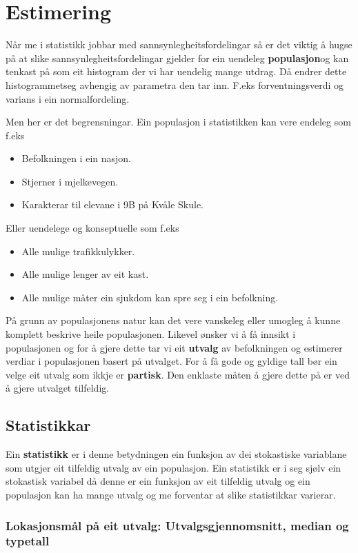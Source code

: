 \chapter{Estimering}
Når me i statistikk jobbar med sannsynlegheitsfordelingar så er det viktig å hugse på at slike sannsynlegheitsfordelingar gjelder for ein uendeleg \startsitat\textbf{populasjon}\sluttsitat og kan tenkast på som eit histogram der vi har uendelig mange utdrag. Då endrer dette \startsitat histogrammet\sluttsitat seg avhengig av parametra den tar inn. F.eks forventningsverdi og varians i ein normalfordeling.

Men her er det begrensningar. Ein populasjon i statistikken kan vere endeleg som f.eks 
\begin{itemize}
    \item Befolkningen i ein nasjon.
    \item Stjerner i mjelkevegen.
    \item Karakterar til elevane i 9B på Kvåle Skule.
\end{itemize}
Eller uendelege og konseptuelle som f.eks
\begin{itemize}
    \item Alle mulige trafikkulykker.
    \item Alle mulige lenger av eit kast.
    \item Alle mulige måter ein sjukdom kan spre seg i ein befolkning.
\end{itemize}

På grunn av populasjonens natur kan det vere vanskeleg eller umogleg å kunne komplett beskrive heile populasjonen. Likevel ønsker vi å få innsikt i populasjonen og for å gjere dette tar vi eit \textbf{utvalg} av befolkningen og estimerer verdiar i populasjonen basert på utvalget. For å få gode og gyldige tall bør ein velge eit utvalg som ikkje er \textbf{partisk}. Den enklaste måten å gjere dette på er ved å gjere utvalget tilfeldig.

\section{Statistikkar}
Ein \textbf{statistikk} er i denne betydningen ein \startsitat funksjon av dei stokastiske variablane som utgjer eit tilfeldig utvalg av ein populasjon\sluttsitat. Ein statistikk er i seg sjølv ein stokastisk variabel då denne er ein funksjon av eit tilfeldig utvalg og ein populasjon kan ha mange utvalg og me forventar at slike statistikkar varierar. 

\subsection{Lokasjonsmål på eit utvalg: Utvalgsgjennomsnitt, median og typetall}

